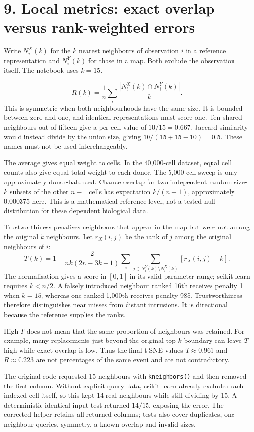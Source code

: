 \documentclass[11pt]{article}
\begin{document}
\clearpage
\section*{9. Local metrics: exact overlap versus rank-weighted errors}
Write $N_i^X(k)$ for the $k$ nearest neighbours of observation $i$ in a reference representation and $N_i^Y(k)$ for those in a map. Both exclude the observation itself. The notebook uses $k=15$.

\[
 R(k)=\frac1n\sum_i\frac{|N_i^X(k)\cap N_i^Y(k)|}{k}.
\]
This is symmetric when both neighbourhoods have the same size. It is bounded between zero and one, and identical representations must score one. Ten shared neighbours out of fifteen give a per-cell value of $10/15=0.667$. Jaccard similarity would instead divide by the union size, giving $10/(15+15-10)=0.5$. These names must not be used interchangeably.

The average gives equal weight to cells. In the 40,000-cell dataset, equal cell counts also give equal total weight to each donor. The 5,000-cell sweep is only approximately donor-balanced. Chance overlap for two independent random size-$k$ subsets of the other $n-1$ cells has expectation $k/(n-1)$, approximately 0.000375 here. This is a mathematical reference level, not a tested null distribution for these dependent biological data.

Trustworthiness penalises neighbours that appear in the map but were not among the original $k$ neighbours. Let $r_X(i,j)$ be the rank of $j$ among the original neighbours of $i$:
\[
 T(k)=1-\frac{2}{nk(2n-3k-1)}
 \sum_i\sum_{j\in N_i^Y(k)\setminus N_i^X(k)}[r_X(i,j)-k].
\]
The normalisation gives a score in $[0,1]$ in its valid parameter range; scikit-learn requires $k<n/2$. A falsely introduced neighbour ranked 16th receives penalty 1 when $k=15$, whereas one ranked 1,000th receives penalty 985. Trustworthiness therefore distinguishes near misses from distant intrusions. It is directional because the reference supplies the ranks.\cite{trust}

High $T$ does not mean that the same proportion of neighbours was retained. For example, many replacements just beyond the original top-$k$ boundary can leave $T$ high while exact overlap is low. Thus the final t-SNE values $T\approx0.961$ and $R\approx0.223$ are not percentages of the same event and are not contradictory.

The original code requested 15 neighbours with \texttt{kneighbors()} and then removed the first column. Without explicit query data, scikit-learn already excludes each indexed cell itself, so this kept 14 real neighbours while still dividing by 15. A deterministic identical-input test returned $14/15$, exposing the error. The corrected helper retains all returned columns; tests also cover duplicates, one-neighbour queries, symmetry, a known overlap and invalid sizes.\cite{neighbors}
\end{document}
